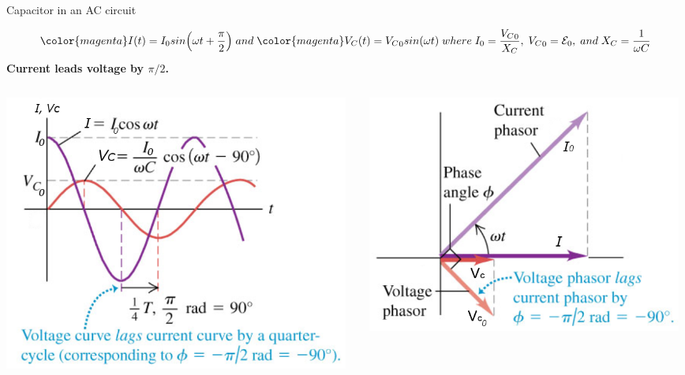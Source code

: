 \begin{frame}{Capacitor in an AC circuit}

\begin{center}
{\scriptsize
\begin{equation*}
   {\color{magenta}  I(t) = I_0 sin \Big(\omega t + \frac{\pi}{2} \Big) } \; and \;
   {\color{magenta}  V_C(t) = {V_C}_0 sin(\omega t)} \;
   where \; I_0 = \frac{{V_C}_0}{X_C}, \; {V_C}_0 = \mathcal{E}_0, \; and \; X_C = \frac{1}{\omega C}
\end{equation*}
}
{\color{magenta}
  {\bf Current leads voltage by $\pi/2$.}
}
\end{center}

\begin{columns}
  \begin{column}{0.50\textwidth}
    \begin{center}
       \includegraphics[width=0.98\textwidth]{./images/schematics/ac_capacitor_graph.png}\\
     \end{center}
  \end{column}
  \begin{column}{0.50\textwidth}
    \begin{center}
       \includegraphics[width=0.98\textwidth]{./images/schematics/ac_capacitor_phasor.png}\\

\end{center}
\end{column}
\end{columns}
\end{frame}
